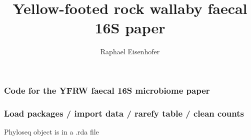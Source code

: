 \documentclass[
  letterpaper,
  DIV=11,
  numbers=noendperiod]{scrartcl}
\title{Yellow-footed rock wallaby faecal 16S paper}
\author{Raphael Eisenhofer}
\date{}
\begin{document}
\maketitle

\subsubsection{Code for the YFRW faecal 16S microbiome
paper}\label{code-for-the-yfrw-faecal-16s-microbiome-paper}

\subsubsection{Load packages / import data / rarefy table / clean
counts}\label{load-packages-import-data-rarefy-table-clean-counts}

Phyloseq object is in a .rda file
\end{document}
